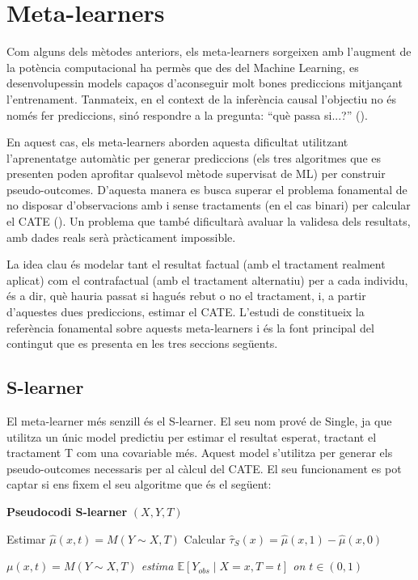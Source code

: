 \documentclass[../main.tex]{subfiles}
\begin{document}
    \chapter{Meta-learners} \label{ch:metalearners}
    Com alguns dels mètodes anteriors, els meta-learners sorgeixen amb l’augment de la potència computacional ha permès que des del Machine Learning, es desenvolupessin models capaços d’aconseguir molt bones prediccions mitjançant l’entrenament. Tanmateix, en el context de la inferència causal l’objectiu no és només fer prediccions, sinó respondre a la pregunta: “què passa si...?” (\citealp{hernan2020}). \par
    En aquest cas, els meta-learners aborden aquesta dificultat utilitzant l’aprenentatge automàtic per generar prediccions (els tres algoritmes que es presenten poden aprofitar qualsevol mètode supervisat de ML) per construir pseudo-outcomes.  D’aquesta manera es busca superar el problema fonamental de no disposar d'observacions amb i sense tractaments (en el cas binari) per calcular el CATE (\citealp{facure2022}). Un problema que també dificultarà avaluar la validesa dels resultats, amb dades reals serà pràcticament impossible. \par
    La idea clau és modelar tant el resultat factual (amb el tractament realment aplicat) com el contrafactual (amb el tractament alternatiu) per a cada individu, és a dir, què hauria passat si hagués rebut o no el tractament, i, a partir d’aquestes dues prediccions, estimar el CATE. L’estudi de \cite{kunzel2019} constitueix la referència fonamental sobre aquests meta-learners i és la font principal del contingut que es presenta en les tres seccions següents.


    \section{S-learner} \label{sec:slearner}
     El meta-learner més senzill és el S-learner. El seu nom prové de Single, ja que utilitza un únic model predictiu per estimar el resultat esperat, tractant el tractament T com una covariable més. Aquest model s’utilitza per generar els pseudo-outcomes necessaris per al càlcul del CATE. El seu funcionament es pot captar si ens fixem el seu algoritme que és el següent:
    
    \begin{table}[H]
        \begin{minipage}{\linewidth}
            \begin{algorithm}[H]
            \caption{\textbf{Pseudocodi S-learner} $(X,Y,T)$}
            \begin{algorithmic}[1]
              \State Estimar $\hat{\mu}(x,t) = M(Y \sim X, T)$
              \State Calcular $\hat{\tau}_S(x) = \hat{\mu}(x,1) - \hat{\mu}(x,0)$
            \end{algorithmic}
            \end{algorithm}
            \vspace{-3ex}
            {\scriptsize\textit{$\mu(x,t) = M(Y \sim X, T)$ estima $\mathbb{E}[Y_{obs} \mid X = x, T = t]$ on $t\in(0,1)$}}
        \end{minipage}
    \end{table}
\end{document}

